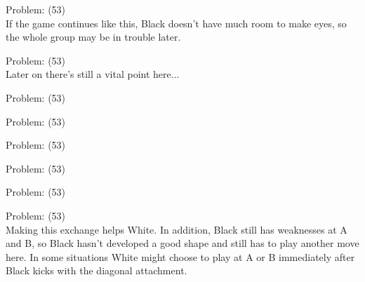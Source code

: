 \documentclass[11pt]{article}
\begin{document}
\begin{minipage}[t]{0.5\textwidth}
  {\centering
  
Problem: (53)\\
If the game continues like this, Black doesn't have much room to make eyes, so the whole group may be in trouble later.\\
  }
\end{minipage}
\begin{minipage}[t]{0.5\textwidth}
  {\centering
  
Problem: (53)\\
Later on there's still a vital point here...\\
  }
\end{minipage}
\begin{minipage}[t]{0.5\textwidth}
  {\centering
  
Problem: (53)\\
  }
\end{minipage}
\begin{minipage}[t]{0.5\textwidth}
  {\centering
  
Problem: (53)\\
  }
\end{minipage}
\begin{minipage}[t]{0.5\textwidth}
  {\centering
  
Problem: (53)\\
  }
\end{minipage}
\begin{minipage}[t]{0.5\textwidth}
  {\centering
  
Problem: (53)\\
  }
\end{minipage}
\begin{minipage}[t]{0.5\textwidth}
  {\centering
  
Problem: (53)\\
  }
\end{minipage}
\begin{minipage}[t]{0.5\textwidth}
  {\centering
  
Problem: (53)\\
Making this exchange helps White. In addition, Black still has weaknesses at A and B, so Black hasn't developed a good shape and still has to play another move here. In some situations White might choose to play at A or B immediately after Black kicks with the diagonal attachment.\\
  }
\end{minipage}
\end{document}
